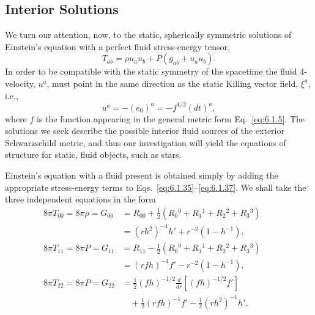 
\subsection{Interior Solutions}\label{sec:6.2}

We turn our attention, now, to the static, spherically symmetric solutions of
Einstein's equation with a perfect fluid stress-energy tensor,
\begin{equation}
  T_{ab}=\rho u_a u_b+P(g_{ab}+u_a u_b).
  \tag{6.2.1}\label{eq:6.2.1}
\end{equation}
In order to be compatible with the static symmetry of the spacetime the fluid
4-velocity, \(u^a\), must point in the same direction as the static Killing vector
field, \(\xi^a\), i.e.,
\begin{equation}
  u^a=-(e_0)^a=-f^{1/2}(dt)^a,
  \tag{6.2.2}\label{eq:6.2.2}
\end{equation}
where \(f\) is the function appearing in the general metric form
Eq.~\eqref{eq:6.1.5}. The solutions we seek describe the possible interior fluid
sources of the exterior Schwarzschild metric, and thus our investigation will
yield the equations of structure for static, fluid objects, such as stars.

Einstein's equation with a fluid present is obtained simply by adding the
appropriate stress-energy terms to Eqs.~\eqref{eq:6.1.35}--\eqref{eq:6.1.37}. We
shall take the three independent equations in the form
\begin{align}
  8\pi T_{00}=8\pi\rho=G_{00}
    &=R_{00}+\frac12(R_0{}^0+R_1{}^1+R_2{}^2+R_3{}^3)\nonumber\\
    &=(rh^2)^{-1}h'+r^{-2}(1-h^{-1}),
  &&\tag{6.2.3}\label{eq:6.2.3}\\
  8\pi T_{11}=8\pi P=G_{11}
    &=R_{11}-\frac12(R_0{}^0+R_1{}^1+R_2{}^2+R_3{}^3)\nonumber\\
    &=(rfh)^{-1}f'-r^{-2}(1-h^{-1}),
  &&\tag{6.2.4}\label{eq:6.2.4}\\
  8\pi T_{22}=8\pi P=G_{22}
    &=\frac12(fh)^{-1/2}\frac{d}{dr}\left[(fh)^{-1/2}f'\right]\nonumber\\
    &\quad+\frac12(rfh)^{-1}f'-\frac12(rh^2)^{-1}h'.
  &&\tag{6.2.5}\label{eq:6.2.5}
\end{align}

